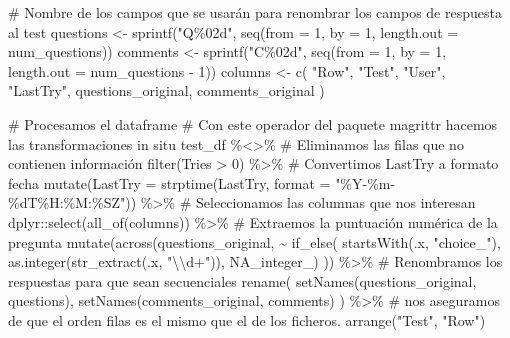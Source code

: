 \documentclass[
  12pt,
  a4paper,
  extrafontsizes,
  onecolumn,
  openright]{memoir}
\newenvironment{Shaded}{\begin{snugshade}}{\end{snugshade}}
\newcommand{\AttributeTok}[1]{\textcolor[rgb]{0.40,0.45,0.13}{#1}}
\newcommand{\CommentTok}[1]{\textcolor[rgb]{0.37,0.37,0.37}{#1}}
\newcommand{\ConstantTok}[1]{\textcolor[rgb]{0.56,0.35,0.01}{#1}}
\newcommand{\DecValTok}[1]{\textcolor[rgb]{0.68,0.00,0.00}{#1}}
\newcommand{\FunctionTok}[1]{\textcolor[rgb]{0.28,0.35,0.67}{#1}}
\newcommand{\NormalTok}[1]{\textcolor[rgb]{0.00,0.23,0.31}{#1}}
\newcommand{\OtherTok}[1]{\textcolor[rgb]{0.00,0.23,0.31}{#1}}
\newcommand{\SpecialCharTok}[1]{\textcolor[rgb]{0.37,0.37,0.37}{#1}}
\newcommand{\StringTok}[1]{\textcolor[rgb]{0.13,0.47,0.30}{#1}}
\begin{document}
\begin{Shaded}
\begin{Highlighting}[]
\CommentTok{\# Nombre de los campos que se usarán para renombrar los campos de respuesta al test}
\NormalTok{questions }\OtherTok{\textless{}{-}} \FunctionTok{sprintf}\NormalTok{(}\StringTok{"Q\%02d"}\NormalTok{, }\FunctionTok{seq}\NormalTok{(}\AttributeTok{from =} \DecValTok{1}\NormalTok{, }\AttributeTok{by =} \DecValTok{1}\NormalTok{, }\AttributeTok{length.out =}\NormalTok{ num\_questions)) }
\NormalTok{comments }\OtherTok{\textless{}{-}} \FunctionTok{sprintf}\NormalTok{(}\StringTok{"C\%02d"}\NormalTok{, }\FunctionTok{seq}\NormalTok{(}\AttributeTok{from =} \DecValTok{1}\NormalTok{, }\AttributeTok{by =} \DecValTok{1}\NormalTok{, }\AttributeTok{length.out =}\NormalTok{ num\_questions }\SpecialCharTok{{-}} \DecValTok{1}\NormalTok{))}
\NormalTok{columns }\OtherTok{\textless{}{-}} \FunctionTok{c}\NormalTok{(}
    \StringTok{"Row"}\NormalTok{, }\StringTok{"Test"}\NormalTok{, }\StringTok{"User"}\NormalTok{, }\StringTok{"LastTry"}\NormalTok{, questions\_original, comments\_original}
\NormalTok{)}

\CommentTok{\# Procesamos el dataframe}
\CommentTok{\# Con este operador del paquete magrittr hacemos las transformaciones in situ}
\NormalTok{test\_df }\SpecialCharTok{\%\textless{}\textgreater{}\%} 
    \CommentTok{\# Eliminamos las filas que no contienen información}
    \FunctionTok{filter}\NormalTok{(Tries }\SpecialCharTok{\textgreater{}} \DecValTok{0}\NormalTok{) }\SpecialCharTok{\%\textgreater{}\%} 
    \CommentTok{\# Convertimos LastTry a formato fecha}
    \FunctionTok{mutate}\NormalTok{(}\AttributeTok{LastTry =} \FunctionTok{strptime}\NormalTok{(LastTry, }\AttributeTok{format =} \StringTok{"\%Y{-}\%m{-}\%dT\%H:\%M:\%SZ"}\NormalTok{)) }\SpecialCharTok{\%\textgreater{}\%} 
    \CommentTok{\# Seleccionamos las columnas que nos interesan}
\NormalTok{    dplyr}\SpecialCharTok{::}\FunctionTok{select}\NormalTok{(}\FunctionTok{all\_of}\NormalTok{(columns)) }\SpecialCharTok{\%\textgreater{}\%} 
    \CommentTok{\# Extraemos la puntuación numérica de la pregunta}
    \FunctionTok{mutate}\NormalTok{(}\FunctionTok{across}\NormalTok{(questions\_original, }\SpecialCharTok{\textasciitilde{}} \FunctionTok{if\_else}\NormalTok{(}
        \FunctionTok{startsWith}\NormalTok{(.x, }\StringTok{"choice\_"}\NormalTok{), }\FunctionTok{as.integer}\NormalTok{(}\FunctionTok{str\_extract}\NormalTok{(.x, }\StringTok{"}\SpecialCharTok{\textbackslash{}\textbackslash{}}\StringTok{d+"}\NormalTok{)), }\ConstantTok{NA\_integer\_}\NormalTok{)}
\NormalTok{    )) }\SpecialCharTok{\%\textgreater{}\%}
    \CommentTok{\# Renombramos los respuestas para que sean secuenciales}
    \FunctionTok{rename}\NormalTok{(}
        \FunctionTok{setNames}\NormalTok{(questions\_original, questions),}
        \FunctionTok{setNames}\NormalTok{(comments\_original, comments)}
\NormalTok{    ) }\SpecialCharTok{\%\textgreater{}\%}
    \CommentTok{\# nos aseguramos de que el orden filas es el mismo que el de los ficheros.}
    \FunctionTok{arrange}\NormalTok{(}\StringTok{"Test"}\NormalTok{, }\StringTok{"Row"}\NormalTok{) }


\end{Highlighting}
\end{Shaded}
\end{document}
